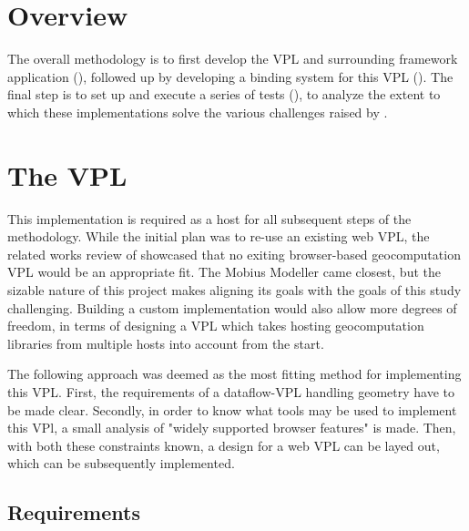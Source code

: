 \section{Overview}

The overall methodology is to first develop the VPL and surrounding framework application (), followed up by developing a binding system for this VPL (). 
The final step is to set up and execute a series of tests (), to analyze the extent to which these implementations solve the various challenges raised by .



\section{The VPL} 
\label{sec:method:base-vpl}

This implementation is required as a host for all subsequent steps of the methodology. 
While the initial plan was to re-use an existing web VPL, the related works review of  showcased that no exiting browser-based geocomputation VPL would be an appropriate fit.
The Mobius Modeller \citep{janssen_mobius_2021} came closest, but the sizable nature of this project makes aligning its goals with the goals of this study challenging. 
Building a custom implementation would also allow more degrees of freedom, in terms of designing a VPL which takes hosting geocomputation libraries from multiple hosts  into account from the start. 

The following approach was deemed as the most fitting method for implementing this VPL. 
First, the requirements of a dataflow-VPL handling geometry have to be made clear.
Secondly, in order to know what tools may be used to implement this VPl, a small analysis of "widely supported browser features" is made. 
Then, with both these constraints known, a design for a web VPL can be layed out, which can be subsequently implemented. 

\subsection{Requirements}

